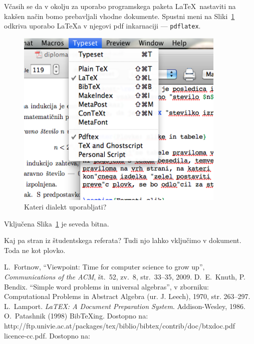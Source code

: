 \documentclass[a4paper, 12pt]{book}
\newcommand{\BibTeX}{{\sc Bib}\TeX}
\begin{document}
Včasih se da v okolju za uporabo programskega paketa \LaTeX\ nastaviti na kakšen način bomo prebavljali vhodne dokumente. Spustni meni na Sliki~\ref{pic2} odkriva uporabo \LaTeX{}a v njegovi pdf inkarnaciji --- {\tt pdflatex}.
\begin{figure}
\begin{center}
\includegraphics[width=10cm]{pic2.png}
\end{center}
\caption{Kateri dialekt uporabljati?}
\label{pic2}
\end{figure} 

Vključena Slika~\ref{pic2} je seveda bitna.

Kaj pa stran iz študentskega referata?\label{pp}
Tudi njo lahko vključimo v dokument. Toda ne kot plovko.
 



\begin{thebibliography}{99}
\label{bibliografija}

 L.\ Fortnow, ``Viewpoint: Time for computer science to grow up'',
{\it Communications of the ACM}, št.\ 52, zv.\ 8, str.\ 33--35, 2009.
 D.\ E.\ Knuth, P. Bendix. ``Simple word problems in universal algebras'', v zborniku: Computational Problems in Abstract Algebra (ur. J. Leech), 1970, str. 263--297.
 L.\ Lamport. {\it LaTEX: A Document Preparation System}. Addison-Wesley, 1986.
 O.\ Patashnik (1998) \BibTeX{}ing. 
Dostopno na:\\ http://ftp.univie.ac.at/packages/tex/biblio/bibtex/contrib/doc/btxdoc.pdf
 licence-cc.pdf. Dostopno na: 

\end{thebibliography}
\end{document}
